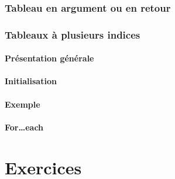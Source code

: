 \documentclass[utf8]{beamer}
\begin{document}
    \section{Tableau en argument ou en retour}\label{sec:tableau-en-argument-ou-en-retour}

    \section{Tableaux à plusieurs indices}\label{sec:tableaux-a-plusieurs-indices}
        \subsection{Présentation générale}\label{subsec:presentation-generale}
        \subsection{Initialisation}\label{subsec:initialisation}
        \subsection{Exemple}\label{subsec:exemple}
        \subsection{For\ldots each}\label{subsec:for-each}

    \part{Exercices}
\end{document}
